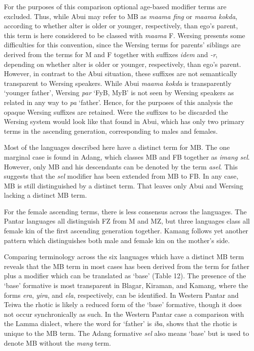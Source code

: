 For the purposes of this comparison optional age-based modifier terms are excluded. Thus, while Abui may refer to MB as \textit{maama fing} or \textit{maama kokda}, according to whether alter is older or younger, respectively, than ego's parent, this term is here considered to be classed with \textit{maama} F. Wersing presents some difficulties for this convention, since the Wersing terms for parents' siblings are derived from the terms for M and F together with suffixes \textit{idem} and \textit{{}-r}, depending on whether alter is older or younger, respectively, than ego's parent. However, in contrast to the Abui situation, these suffixes are not semantically transparent to Wersing speakers. While Abui \textit{maama kokda} is transparently `younger father', Wersing \textit{par} `FyB, MyB' is not seen by Wersing speakers as related in any way to \textit{pa} `father'. Hence, for the purposes of this analysis the opaque Wersing suffixes are retained. Were the suffixes to be discarded the Wersing system would look like that found in Abui, which has only two primary terms in the ascending generation, corresponding to males and females.

Most of the languages described here have a distinct term for MB. The one marginal case is found in Adang, which classes MB and FB together as \textit{imang sel}. However, only MB and his descendants can be denoted by the term \textit{asel}. This suggests that the \textit{sel} modifier has been extended from MB to FB. In any case, MB is still distinguished by a distinct term. That leaves only Abui and Wersing lacking a distinct MB term.

For the female ascending terms, there is less consensus across the languages. The Pantar languages all distinguish FZ from M and MZ, but three languages class all female kin of the first ascending generation together. Kamang follows yet another pattern which distinguishes both male and female kin on the mother's side.

Comparing terminology across the six languages which have a distinct MB term reveals that the MB term in most cases has been derived from the term for father plus a modifier which can be translated as `base' (Table 12). The presence of the `base' formative is most transparent in Blagar, Kiraman, and Kamang, where the forms \textit{era}, \textit{yira}, and \textit{ela}, respectively, can be identified. In Western Pantar and Teiwa the rhotic is likely a reduced form of the `base' formative, though it does not occur synchronically as such. In the Western Pantar case a comparison with the Lamma dialect, where the word for `father' is \textit{iba}, shows that the rhotic is unique to the MB term. The Adang formative \textit{sel} also means `base' but is used to denote MB without the \textit{mang} term.




